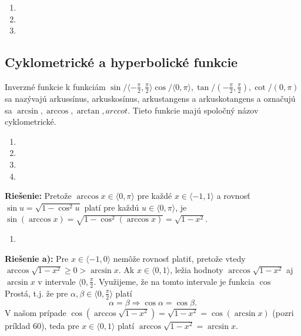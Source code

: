 \begin{enumerate}[resume]
  \item {}
  \item {}
  \item {}
\end{enumerate}

\subsection{Cyklometrické a hyperbolické funkcie}

Inverzné funkcie k funkciám $\sin/\langle-\frac{\pi}{2},\frac{\pi}{2}\rangle \cos/\langle 0,\pi\rangle,\tan/(-\frac{\pi}{2},\frac{\pi}{2}),\cot/(0,\pi)$ sa nazývajú arkussínus, arkuskosínus, arkustangens a arkuskotangens a označujú sa $\arcsin,\arccos,\arctan,arccot$. Tieto funkcie majú spoločný názov cyklometrické.

\begin{enumerate}[resume]
  \item {}
  \item {}
  \item {}
  \item {}
\end{enumerate}

\textbf{Riešenie:} Pretože $\arccos x\in\langle 0,\pi\rangle$ pre každé $x\in\langle -1,1\rangle$ a rovnosť $\sin u=\sqrt{1-\cos^2 u}$ platí pre každú $u\in\langle 0,\pi\rangle$, je $\sin(\arccos x)=\sqrt{1-\cos^2(\arccos x)}=\sqrt{1-x^2}$.

\begin{enumerate}[resume]
  \item {}
\end{enumerate}

\textbf{Riešenie a):} Pre $x\in\langle-1,0\rangle$ nemôže rovnosť platiť, pretože vtedy $\arccos\sqrt{1-x^2}\geq 0>\arcsin x$. Ak $x\in\langle 0,1\rangle$, ležia hodnoty $\arccos\sqrt{1-x^2}$ aj $\arcsin x$ v intervale $\langle 0,\frac{\pi}{2}$. Využijeme, že na tomto intervale je funkcia $\cos$ Prostá, t.j. že pre $\alpha,\beta\in\langle 0,\frac{\pi}{2}\rangle$ platí $$\alpha=\beta\Rightarrow\cos\alpha=\cos\beta.$$
 V našom prípade $\cos(\arccos\sqrt{1-x^2})=\sqrt{1-x^2}=\cos(\arcsin x)$ (pozri príklad $60$), teda pre $x\in\langle 0,1\rangle$ platí $\arccos\sqrt{1-x^2}=\arcsin x$.
 
